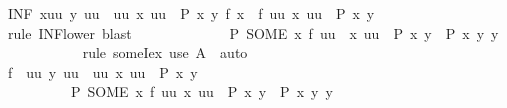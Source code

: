 \begin{isabellebody}
\ {\isachardoublequoteopen}{\isacharparenleft}{\kern0pt}INF\ x{\isasymin}{\isacharbraceleft}{\kern0pt}uu{\isachardot}{\kern0pt}\ {\isasymexists}y{\isachardot}{\kern0pt}\ uu\ {\isacharequal}{\kern0pt}\ {\isacharbraceleft}{\kern0pt}uu{\isachardot}{\kern0pt}\ {\isasymexists}x{\isachardot}{\kern0pt}\ uu\ {\isacharequal}{\kern0pt}\ P\ x\ y{\isacharbraceright}{\kern0pt}{\isacharbraceright}{\kern0pt}{\isachardot}{\kern0pt}\ f\ x{\isacharparenright}{\kern0pt}\ {\isasymle}\ f\ {\isacharbraceleft}{\kern0pt}uu{\isachardot}{\kern0pt}\ {\isasymexists}x{\isachardot}{\kern0pt}\ uu\ {\isacharequal}{\kern0pt}\ P\ x\ y{\isacharbraceright}{\kern0pt}{\isachardoublequoteclose}\isanewline
\ \ \ \ \ \ \ \ \ \ \isamarkupfalse%
\ {\isacharparenleft}{\kern0pt}rule\ INF{\isacharunderscore}{\kern0pt}lower{\isacharcomma}{\kern0pt}\ blast{\isacharparenright}{\kern0pt}\isanewline
\ \ \ \ \ \ \ \ \isamarkupfalse%
\ \isamarkupfalse%
\ {\isachardoublequoteopen}{\isachardot}{\kern0pt}{\isachardot}{\kern0pt}{\isachardot}{\kern0pt}\ {\isasymle}\ P\ {\isacharparenleft}{\kern0pt}SOME\ x{\isachardot}{\kern0pt}\ f\ {\isacharbraceleft}{\kern0pt}uu\ {\isachardot}{\kern0pt}\ {\isasymexists}x{\isachardot}{\kern0pt}\ uu\ {\isacharequal}{\kern0pt}\ P\ x\ y{\isacharbraceright}{\kern0pt}\ {\isacharequal}{\kern0pt}\ P\ x\ y{\isacharparenright}{\kern0pt}\ y{\isachardoublequoteclose}\isanewline
\ \ \ \ \ \ \ \ \ \ \isamarkupfalse%
\ {\isacharparenleft}{\kern0pt}rule\ someI{}{\isacharunderscore}{\kern0pt}ex{\isacharparenright}{\kern0pt}\ {\isacharparenleft}{\kern0pt}use\ A\ \ auto{\isacharparenright}{\kern0pt}\isanewline
\ \ \ \ \ \ \ \ \isamarkupfalse%
\ \isamarkupfalse%
\ {\isachardoublequoteopen}{\isasymSqinter}{\isacharparenleft}{\kern0pt}f\ {\isacharbackquote}{\kern0pt}\ {\isacharbraceleft}{\kern0pt}uu{\isachardot}{\kern0pt}\ {\isasymexists}y{\isachardot}{\kern0pt}\ uu\ {\isacharequal}{\kern0pt}\ {\isacharbraceleft}{\kern0pt}uu{\isachardot}{\kern0pt}\ {\isasymexists}x{\isachardot}{\kern0pt}\ uu\ {\isacharequal}{\kern0pt}\ P\ x\ y{\isacharbraceright}{\kern0pt}{\isacharbraceright}{\kern0pt}{\isacharparenright}{\kern0pt}\ {\isasymle}\isanewline
\ \ \ \ \ \ \ \ \ \ P\ {\isacharparenleft}{\kern0pt}SOME\ x{\isachardot}{\kern0pt}\ f\ {\isacharbraceleft}{\kern0pt}uu{\isachardot}{\kern0pt}\ {\isasymexists}x{\isachardot}{\kern0pt}\ uu\ {\isacharequal}{\kern0pt}\ P\ x\ y{\isacharbraceright}{\kern0pt}\ {\isacharequal}{\kern0pt}\ P\ x\ y{\isacharparenright}{\kern0pt}\ y{\isachardoublequoteclose}\isanewline

\end{isabellebody}
